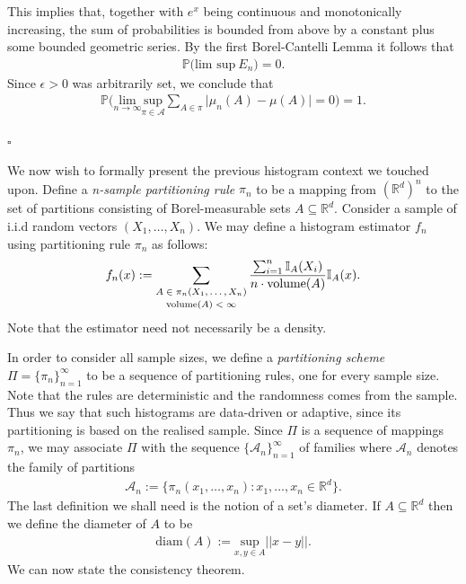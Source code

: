 \documentclass{report}
\begin{document}
This implies that, together with $e^x$ being continuous and monotonically increasing, the sum of probabilities is bounded from above by a constant plus some bounded geometric series.
By the first Borel-Cantelli Lemma it follows that 
\begin{align*}
	\mathbb{P}\big(\text{lim sup} \ E_n \big) = 0.
\end{align*}
Since $\epsilon > 0$ was arbitrarily set, we conclude that 
\begin{align*}
	\mathbb{P}\bigg( \underset{n \rightarrow \infty}{\text{lim}}
	\underset{\pi \in \mathcal{A}}{\text{sup}}\sum_{A \in \pi} \big|\mu_n(A) - \mu(A)\big| = 0 \bigg) = 1.
\end{align*}

\hfill$\square$

\noindent \newline
We now wish to formally present the previous histogram context we touched upon. Define a \textit{n-sample partitioning rule} $\pi_n$ to be a 
mapping from $(\mathbb{R}^d)^n$ to the set of partitions consisting of Borel-measurable sets $A \subseteq \mathbb{R}^d$. Consider a sample of i.i.d random vectors $(X_1,\dots,X_n)$.
We may define a histogram estimator $f_n$ using partitioning rule $\pi_n$ as follows:
\begin{align*}
	f_n(x) := \sum_{\textrm{\shortstack{$A \in \pi_n(X_1,\dots,X_n)$\\\text{volume}$(A) < \infty$}}} \frac{\sum_{i=1}^n \mathbb{I}_A(X_i)}{n \cdot \text{volume}(A)}\mathbb{I}_{A}(x).
\end{align*}
Note that the estimator need not necessarily be a density.

In order to consider all sample sizes, we define a \textit{partitioning scheme} $\Pi = \{\pi_n\}_{n=1}^\infty$ to be a sequence of partitioning rules,
one for every sample size. Note that the rules are deterministic and the randomness comes from the sample. Thus we say that such histograms are data-driven or adaptive, since its
partitioning is based on the realised sample.
Since $\Pi$ is a sequence of mappings $\pi_n$, we may associate $\Pi$ with the sequence $\{\mathcal{A}_n\}_{n=1}^\infty$ of families where $\mathcal{A}_n$ denotes the family of partitions
\begin{align*}
	\mathcal{A}_n := \{\pi_n(x_1,\dots,x_n) : x_1,\dots,x_n \in \mathbb{R}^d \}.
\end{align*}
The last definition we shall need is the notion of a set's diameter. If $A \subseteq \mathbb{R}^d$ then we define the diameter of $A$ to be 
\begin{align*}
	\text{diam}(A) := \underset{x,y\in A}{\text{sup}}||x-y||.
\end{align*}
We can now state the consistency theorem.\newline
\end{document}
